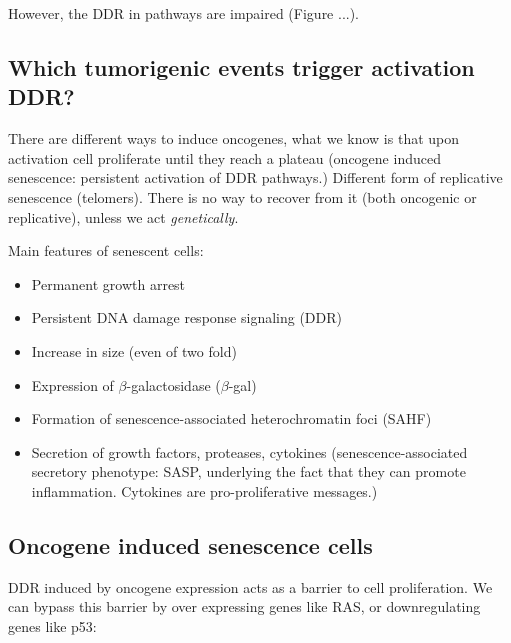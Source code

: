 However, the DDR in pathways are impaired (Figure ...).

\hypertarget{which-tumorigenic-events-trigger-activation-ddr-very-early-in-tumorigenesis}{%
\subsection{Which tumorigenic events trigger activation DDR?}\label{which-tumorigenic-events-trigger-activation-ddr-very-early-in-tumorigenesis}}

There are different ways to induce oncogenes, what we know is that upon
activation cell proliferate until they reach a plateau (oncogene
induced senescence: persistent activation of DDR pathways.) Different
form of replicative senescence (telomers). There is no way to recover from it
(both oncogenic or replicative), unless we act \emph{genetically}.


Main features of senescent cells: 
\begin{itemize}
\tightlist
\item Permanent growth arrest 
\item Persistent DNA damage response signaling (DDR) 
\item Increase in size (even of two
fold)
\item Expression of $\beta$-galactosidase ($\beta$-gal) 
\item Formation of
senescence-associated heterochromatin foci (SAHF) 
\item Secretion of growth
factors, proteases, cytokines (senescence-associated secretory
phenotype: SASP, underlying the fact that they can promote inflammation.
Cytokines are pro-proliferative messages.)
\end{itemize}


\hypertarget{oncogene-induced-senescence-cells}{%
\subsection{Oncogene induced senescence
cells}\label{oncogene-induced-senescence-cells}}

DDR
induced by oncogene expression acts as a barrier to cell proliferation.
We can bypass this barrier by over expressing genes like RAS, or
downregulating genes like p53:

